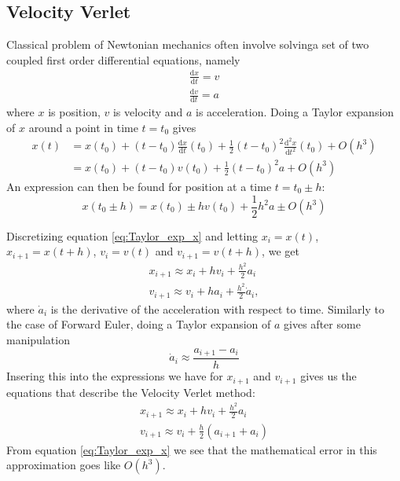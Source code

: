 \documentclass[reprint, english,notitlepage,nofootinbib]{revtex4-1}  %
\begin{document}
\subsection{Velocity Verlet}

Classical problem of Newtonian mechanics often involve solvinga set of two coupled first order differential equations, namely
\begin{align*}
  \frac{\mathrm d x}{\mathrm dt} = v \\
  \frac{\mathrm d v}{\mathrm dt} = a
\end{align*}
where $x$ is position, $v$ is velocity and $a$ is acceleration. Doing a Taylor expansion of $x$ around a point in time $t = t_0$ gives
\begin{align*}
  x(t) &= x(t_0) + (t - t_0) \frac{\mathrm d x}{\mathrm dt}(t_0) + \frac{1}{2} (t - t_0)^2 \frac{\mathrm d^2 x}{\mathrm dt^2}(t_0) + O(h^3) \\
  &= x(t_0) + (t - t_0) v(t_0) + \frac{1}{2} (t - t_0)^2 a + O(h^3)
\end{align*}
An expression can then be found for position at a time $t = t_0 \pm h$:
\begin{equation}
  \label{eq:Taylor_exp_x}
  x(t_0 \pm h) = x(t_0) \pm h v(t_0) + \frac{1}{2} h^2 a \pm O(h^3)
\end{equation}

Discretizing equation \ref{eq:Taylor_exp_x} and letting $x_i = x(t)$, $x_{i+1} = x(t + h)$, $v_i = v(t)$ and $v_{i+1} = v(t + h)$, we get
\begin{align*}
  x_{i+1} \approx x_i + h v_i + \frac{h^2}{2} a_i \\
  v_{i+1} \approx v_i + h a_i + \frac{h^2}{2} \dot a_i,
\end{align*}
where $\dot a_i$ is the derivative of the acceleration with respect to time. Similarly to the case of Forward Euler, doing a Taylor expansion of $a$ gives after some manipulation
\begin{equation}
  \dot a_i \approx \frac{a_{i+1} - a_i}{h}
\end{equation}
Insering this into the expressions we have for $x_{i+1}$ and $v_{i+1}$ gives us the equations that describe the Velocity Verlet method:
\begin{align*}
  x_{i+1} \approx x_i + h v_i + \frac{h^2}{2} a_i \\
  v_{i+1} \approx v_i + \frac{h}{2} (a_{i+1} + a_i)
\end{align*}
From equation \ref{eq:Taylor_exp_x} we see that the mathematical error in this approximation goes like $O(h^3)$.
\end{document}
